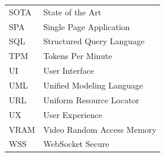 \begin{longtable}{p{3cm} p{10cm}}
SOTA & State of the Art \\
SPA & Single Page Application \\
SQL & Structured Query Language \\
TPM & Tokens Per Minute \\
UI & User Interface \\
UML & Unified Modeling Language \\
URL & Uniform Resource Locator \\
UX & User Experience \\
VRAM & Video Random Access Memory \\
WSS & WebSocket Secure \\
\end{longtable}
